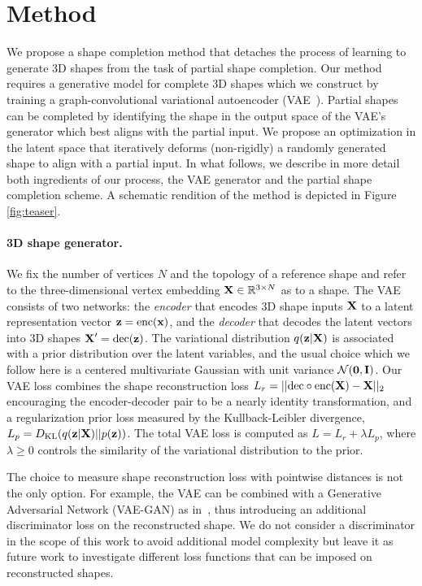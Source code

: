 \section{Method}
\label{sec:method}
We propose a shape completion method that detaches the process of learning to generate 3D shapes from the task of partial shape completion. Our method requires a generative model for complete 3D shapes which we construct by training a graph-convolutional variational autoencoder (VAE~\cite{kingma2014iclr}). Partial shapes can be completed by identifying the shape in the output space of the VAE's generator which best aligns with the partial input. We propose an optimization in the latent space that iteratively deforms (non-rigidly) a randomly generated shape to align with a partial input. In what follows, we describe in more detail both ingredients of our process, the VAE generator and the partial shape completion scheme. A schematic rendition of the method is depicted in Figure \ref{fig:teaser}.

\paragraph{3D shape generator.}
We fix the number of vertices $N$ and the topology of a reference shape and refer to the three-dimensional vertex embedding $\bm{\mathrm{X}}  \in \mathbb{R}^{3 \times N}$ as to a shape.
%
The VAE consists of two networks: the \emph{encoder} that encodes 3D shape inputs $\bm{\mathrm{X}}$ to a latent representation vector $\bm{\mathrm{z}}=\mathrm{enc}(\bm{\mathrm{x}})$, and the \emph{decoder} that decodes the latent vectors into 3D shapes $\bm{\mathrm{X}}'=\mathrm{dec}(\bm{\mathrm{z}})$. The variational distribution $q(\bm{\mathrm{z}}|\bm{\mathrm{X}})$ is associated with a prior distribution over the latent variables, and the usual choice which we follow here is a centered multivariate Gaussian with unit variance $\mathcal{N}(\bm{\mathrm{0}},\bm{\mathrm{I}})$. Our VAE loss combines the shape reconstruction loss $L_r = ||\mathrm{dec}\circ \mathrm{enc} (\bm{\mathrm{X}})-\bm{\mathrm{X}}||_2$ encouraging the encoder-decoder pair to be a nearly identity transformation, and a regularization prior loss measured by the Kullback-Leibler divergence, $L_p=D_\mathrm{KL}(q(\bm{\mathrm{z}}|\bm{\mathrm{X}})||p(\bm{\mathrm{z}}))$. The total VAE loss is computed as $L=L_r + \lambda L_p$, where $\lambda \geq 0$ controls the similarity of the variational distribution to the prior.

The choice to measure shape reconstruction loss with pointwise distances is not the only option. For example, the VAE can be combined with a Generative Adversarial Network (VAE-GAN) as in~\cite{larsen16icml,wu16nips}, thus introducing an additional discriminator loss on the reconstructed shape. We do not consider a discriminator in the scope of this work to avoid additional model complexity but leave it as future work to investigate different loss functions that can be imposed on reconstructed shapes.

